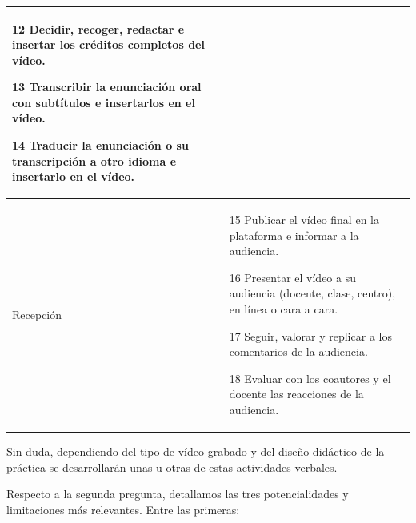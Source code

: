 \documentclass[spanish]{textolivre}
\begin{document}
\begin{table}[htbp]
\begin{tabular}{p{2cm} p{12cm}}
    12 Decidir, recoger, redactar e insertar los créditos completos del vídeo.
    
    13 Transcribir la enunciación oral con subtítulos e insertarlos en el vídeo.
    
    14 Traducir la enunciación o su transcripción a otro idioma e insertarlo en el vídeo. \\
\midrule
Recepción &     15 Publicar el vídeo final en la plataforma e informar a la audiencia.

    16 Presentar el vídeo a su audiencia (docente, clase, centro), en línea o cara a cara.
    
    17 Seguir, valorar y replicar a los comentarios de la audiencia.
    
    18 Evaluar con los coautores y el docente las reacciones de la audiencia. \\
\bottomrule
\end{tabular}
\end{table}

Sin duda, dependiendo del tipo de vídeo grabado y del diseño didáctico de la práctica se desarrollarán unas u otras de estas actividades verbales.

Respecto a la segunda pregunta, detallamos las tres potencialidades y limitaciones más relevantes. Entre las primeras:
\end{document}
